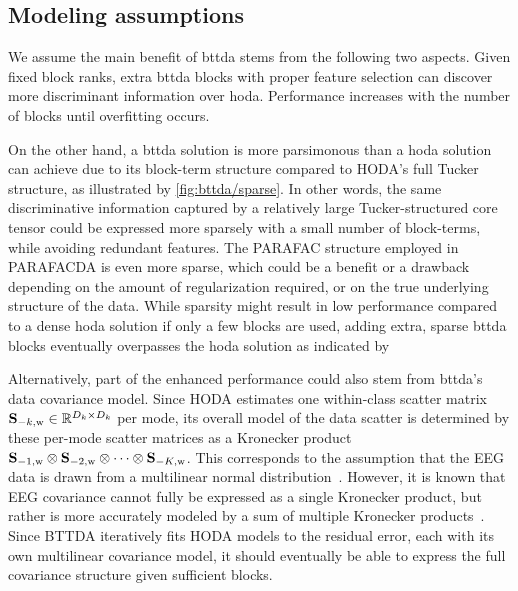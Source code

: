 \documentclass[twocolumn]{article}
\begin{document}
	\subsection{Modeling assumptions}

	We assume the main benefit of \ac{bttda} stems from the following two aspects.
	Given fixed block ranks, extra \ac{bttda} blocks with proper feature selection
	can discover more discriminant information over \ac{hoda}.
	Performance increases with the number of blocks until overfitting occurs.

	On the other hand, a \ac{bttda} solution is more parsimonous than a \ac{hoda}
	solution can achieve due to its block-term structure compared to HODA's full Tucker
	structure, as illustrated	by \cref{fig:bttda/sparse}.
	In other words, the same discriminative information captured by a relatively large
	Tucker-structured core tensor could be expressed more sparsely with a small
	number of block-terms, while avoiding redundant features.
	The PARAFAC structure employed in PARAFACDA is even more sparse, which could be
	a benefit or a drawback depending on the amount of regularization required,
	or on the true underlying structure of the data.
	While sparsity might result in low performance compared to a dense \ac{hoda}
	solution if only a few blocks are used, adding extra, sparse \ac{bttda}
	blocks  eventually overpasses the \ac{hoda} solution as indicated by

	Alternatively, part of the enhanced performance could also stem from \ac{bttda}'s
	data covariance model.
	Since HODA estimates one within-class scatter matrix
$\mathbf{S}_{-k,\text{w}}\in\mathbb{R}^{D_k\times D_k}$ per mode, its overall
	model of the data scatter is determined by these per-mode scatter matrices as a
	Kronecker product $\mathbf{S}_{-1,\text{w}}\otimes \mathbf{S}_{-2,\text{w}}\otimes\cdots\otimes \mathbf{S}_{-K,\text{w}}$.
	This corresponds to the assumption that the EEG data is
	drawn from a multilinear normal distribution~\cite{Ohlson2013}.
	However, it is known that EEG covariance cannot fully be expressed as a
	single Kronecker product, but rather is more accurately modeled by a sum of
	multiple Kronecker products~\cite{Bijma2005, Sosulski2022}.
	Since BTTDA iteratively fits HODA models to the residual error, each with its own
	multilinear covariance model, it should eventually be able to express the full
	covariance structure given sufficient blocks.
\end{document}
